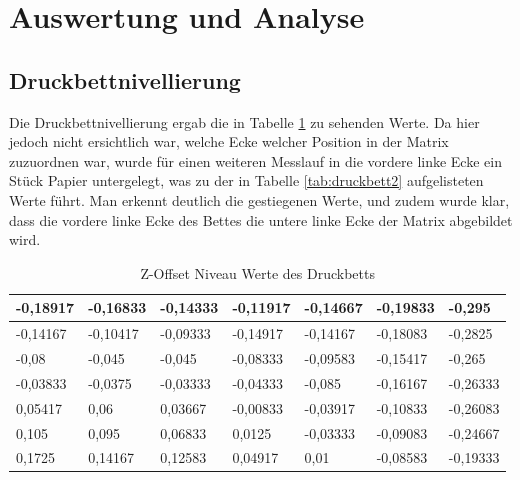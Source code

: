 \documentclass[a4paper,12pt,bibtotocnumbered]{scrartcl}
\numberwithin{equation}{section} %
\begin{document}
\section[Auswertung und Analyse]{Auswertung und Analyse}
\subsection*{Druckbettnivellierung}
Die Druckbettnivellierung ergab die in Tabelle \ref*{tab:druckbett1} zu sehenden Werte. Da hier jedoch nicht ersichtlich war, welche Ecke welcher Position in der Matrix zuzuordnen war, wurde für einen weiteren Messlauf in die vordere linke Ecke ein Stück Papier untergelegt, was zu der in Tabelle \ref*{tab:druckbett2} aufgelisteten Werte führt. Man erkennt deutlich die gestiegenen Werte, und zudem wurde klar, dass die vordere linke Ecke des Bettes die untere linke Ecke der Matrix abgebildet wird. 

\begin{table}[H]
\centering
\caption{Z-Offset Niveau Werte des Druckbetts}
\label{tab:druckbett1}
\begin{tabular}{|l|l|l|l|l|l|l|}
\hline
-0,18917 & -0,16833 & -0,14333 & -0,11917 & -0,14667 & -0,19833 & -0,295   \\ \hline
-0,14167 & -0,10417 & -0,09333 & -0,14917 & -0,14167 & -0,18083 & -0,2825  \\ \hline
-0,08    & -0,045   & -0,045   & -0,08333 & -0,09583 & -0,15417 & -0,265   \\ \hline
-0,03833 & -0,0375  & -0,03333 & -0,04333 & -0,085   & -0,16167 & -0,26333 \\ \hline
0,05417  & 0,06     & 0,03667  & -0,00833 & -0,03917 & -0,10833 & -0,26083 \\ \hline
0,105    & 0,095    & 0,06833  & 0,0125   & -0,03333 & -0,09083 & -0,24667 \\ \hline
0,1725   & 0,14167  & 0,12583  & 0,04917  & 0,01     & -0,08583 & -0,19333 \\ \hline
\end{tabular}
\end{table}
\end{document}
